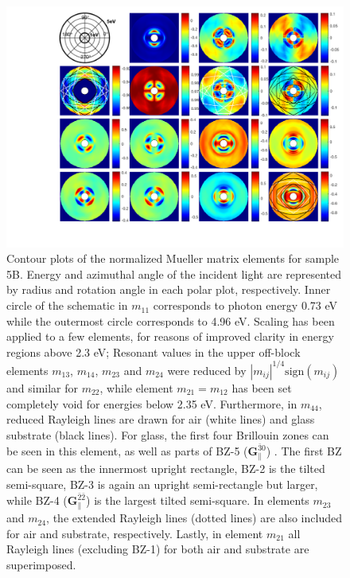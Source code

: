 \begin{figure}[h]  %
    \centering
    \includegraphics[width=\linewidth, trim=3cm 1cm 0.4cm 0cm, clip]{figures/ch4/S5B/contour/Muller_rot_S5B_COMSOLSIM_55_final(2).pdf}
    \caption{Contour plots of the normalized Mueller matrix elements for sample 5B. Energy and azimuthal angle of the incident light are represented by radius and rotation angle in each polar plot, respectively. Inner circle of the schematic in $m_{11}$ corresponds to photon energy 0.73 eV while the outermost circle corresponds to 4.96 eV. Scaling has been applied to a few elements, for reasons of improved clarity in energy regions above 2.3 eV; Resonant values in the upper off-block elements $m_{13}$, $m_{14}$, $m_{23}$ and $m_{24}$ were reduced by $|m_{ij}|^{1/4}\text{sign}(m_{ij})$ and similar for $m_{22}$, while element $m_{21}=m_{12}$ has been set completely void for energies below 2.35 eV. Furthermore, in $m_{44}$, reduced Rayleigh lines are drawn for air (white lines) and glass substrate (black lines). For glass, the first four Brillouin zones can be seen in this element, as well as parts of BZ-5 ($\mathbf{G}_\parallel^{\bar{3}0}$) . The first BZ can be seen as the innermost upright rectangle, BZ-2 is the tilted semi-square, BZ-3 is again an upright semi-rectangle but larger, while BZ-4  ($\mathbf{G}_\parallel^{\bar{2}\bar{2}}$) is the largest tilted semi-square. In elements $m_{23}$ and $m_{24}$, the extended Rayleigh lines (dotted lines) are also included for air and substrate, respectively. Lastly, in element $m_{21}$ all Rayleigh lines (excluding BZ-1) for both air and substrate are superimposed.} 
    \label{fig:S5B_contour_MM_exp}
\end{figure}

